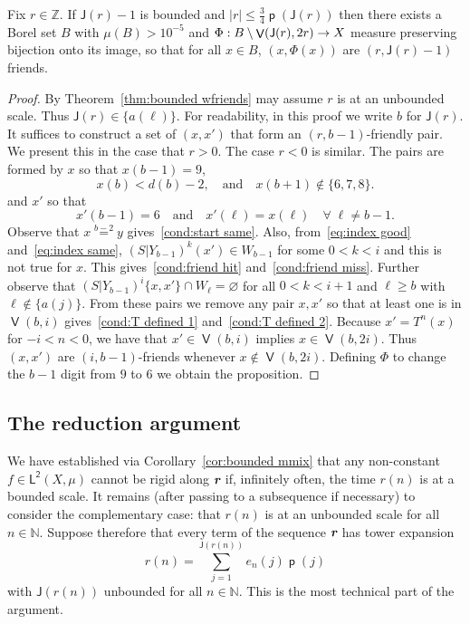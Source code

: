 \documentclass[10pt]{amsart}
\theoremstyle{definition}\newtheorem{defi}[theo]{Definition}\newtheorem{rema}[theo]{Remark}\newtheorem{exam}[theo]{Example}\newtheorem{exem}[theo]{Example}\newtheorem{nota}[theo]{Notation}
\DeclareMathOperator{\bad}{\mathsf{V}}
\DeclareMathOperator{\p}{\mathsf{p}}
\newcommand{\N}{\mathbb{N}}
\newcommand{\Z}{\mathbb{Z}}
\newcommand{\lp}{\mathsf{L}}
\newcommand{\ltwo}{\lp^{\!\mathsf{2}}}
\newcommand{\scl}{\mathsf{J}}
\def\mathbi#1{\textbf{\em #1}}
\newcommand{\bir}{\mathbi{r}}
\renewcommand{\emptyset}{\varnothing}
\renewcommand*{\to}{\mathchoice{\longrightarrow}{\rightarrow}{\rightarrow}{\rightarrow}}
\let\oldforall\forall
\renewcommand*{\forall}{\mathrel{\oldforall}}
\begin{document}
\begin{prop}\label{prop:small friend}
Fix $r \in \Z$. If $\scl(r) - 1$ is bounded and $|r|\leq \frac{3}{4} \p(\scl(r))$ then there exists a Borel set $B$ with $\mu(B)>10^{-5}$ and $\Phi:B \setminus \bad(\scl(r),2r) \to X$ measure preserving bijection onto its image, so that for all $x \in B$, $(x,\Phi(x))$ are $(r,\scl(r)-1)$ friends.
\end{prop}
\begin{proof}
By Theorem~\ref{thm:bounded wfriends} may assume $r$ is at an unbounded scale. Thus $\scl(r) \in \{a(\ell)\}$. For readability, in this proof we write $b$ for $\scl(r)$. It suffices to construct a set of $(x,x')$ that form an $(r,b-1)$-friendly pair. We present this in the case that $r>0$. The case $r<0$ is similar. The pairs are formed by $x$ so that $x(b-1)=9$,
\begin{equation}\label{eq:index good}
x(b) < d(b)-2, \quad\text{and}\quad x(b+1)\notin \{6, 7,8\}.
\end{equation}
and $x'$ so that
\begin{equation}\label{eq:index same}
x'(b-1) = 6 \quad\text{and}\quad x'(\ell)=x(\ell)\quad \forall\; \ell \neq b-1.
\end{equation}
Observe that $x \overset{b-2}{=} y$ gives~\eqref{cond:start same}. Also, from~\eqref{eq:index good} and~\eqref{eq:index same}, $(S|Y_{b-1})^k(x') \in W_{b-1}$ for some $0<k<i$ and this is not true for $x$. This gives~\eqref{cond:friend hit} and~\eqref{cond:friend miss}. Further observe that $(S|Y_{b-1})^i \{x,x'\} \cap W_\ell = \emptyset$ for all $0<k<i+1$ and $\ell \geq b$ with $\ell \notin \{a(j)\}$. From these pairs we remove any pair $x,x'$ so that at least one is in $\bad(b,i)$ gives~\eqref{cond:T defined 1} and~\eqref{cond:T defined 2}. Because $x'=T^n(x)$ for $-i<n<0$, we have that $x' \in \bad(b,i)$ implies $x \in \bad(b,2i)$. Thus $(x,x')$ are $(i,b-1)$-friends whenever $x \notin \bad(b,2i)$. Defining $\Phi$ to change the $b-1$ digit from $9$ to $6$ we obtain the proposition.
\end{proof}



\subsection{The reduction argument}\label{subsec:reduction summary}

We have established via Corollary~\ref{cor:bounded mmix} that any non-constant $f \in \ltwo(X,\mu)$ cannot be rigid along $\bir$ if, infinitely often, the time $r(n)$ is at a bounded scale. It remains (after passing to a subsequence if necessary) to consider the complementary case: that $r(n)$ is at an unbounded scale for all $n \in \N$. Suppose therefore that every term of the sequence $\bir$ has tower expansion
\[
r(n) = \sum_{j=1}^{\scl(r(n))} e_n(j) \p(j)
\]
with $\scl(r(n))$ unbounded for all $n \in \N$. This is the most technical part of the argument.
\end{document}
